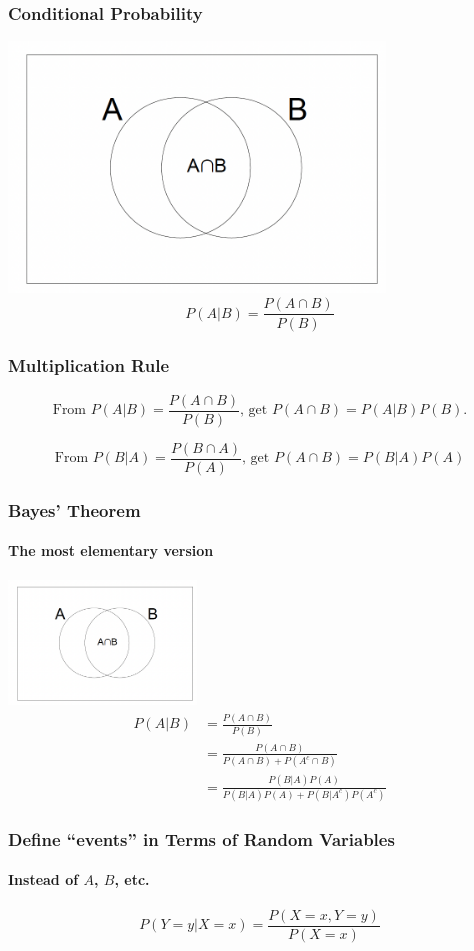 \documentclass[12pt]{beamer}
\begin{document}
\begin{frame}
	\frametitle{Conditional Probability}
	
\centering
\includegraphics[width=10cm]{bayes.png}
$$P(A|B)=\frac{P(A\cap B)}{P(B)}$$

	
\end{frame}
\begin{frame}
	\frametitle{Multiplication Rule}
	
	\[
	\text{From }P(A|B) = \frac{P(A\cap B)}{P(B)}\text{, get }P(A\cap B) = P(A|B)P(B).
	\]
	
	\[
	\text{From }P(B|A) = \frac{P(B\cap A)}{P(A)}\text{, get }P(A\cap B) = P(B|A)P(A)
	\]
	
\end{frame}
\begin{frame}
	\frametitle{Bayes' Theorem}
	\framesubtitle{The most elementary version}
	\centering
	\includegraphics[width=5cm]{bayes.png}
	\[
	\begin{aligned}
		P(A|B) &= \frac{P(A\cap B)}{P(B)} \\
		&= \frac{P(A\cap B)}{P(A\cap B) + P(A^c\cap B)} \\
		&= \frac{P(B|A)P(A)}{P(B|A)P(A) + P(B|A^c)P(A^c)}
	\end{aligned}
	\]
	
\end{frame}
\begin{frame}
	\frametitle{Define ``events'' in Terms of Random Variables}
	\framesubtitle{Instead of $A$, $B$, etc.}
	
	\[
	P(Y = y|X = x) = \frac{P(X = x, Y = y)}{P(X = x)}
	\]
	
\end{frame}
\end{document}
